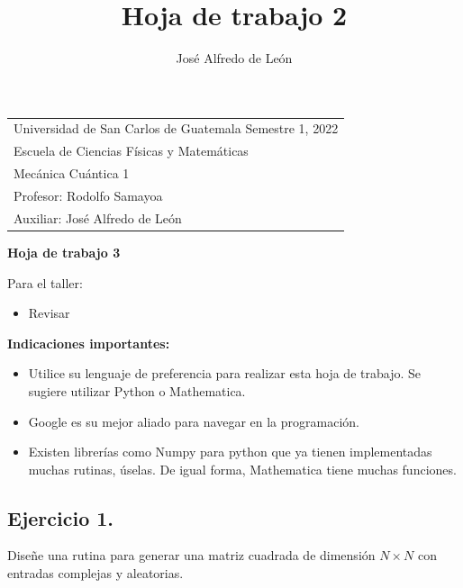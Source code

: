 \documentclass[11pt,letterpaper]{article}
\author{José Alfredo de León}
\title{Hoja de trabajo 2 \hspace{\fill}}
\begin{document}
\noindent
{}
\hspace{23mm}
\begin{tabular}{p{149mm}}
Universidad de San Carlos de Guatemala \hspace*{\fill} Semestre 1, 2022 \\
Escuela de Ciencias Físicas y Matemáticas  \\
Mecánica Cuántica 1            \\
Profesor: Rodolfo Samayoa      \\
Auxiliar: José Alfredo de León \\
\end{tabular}

\begin{center}
\bf\Large Hoja de trabajo 3
\end{center}

\noindent
\textcolor{jacolor}{
Para el taller: 
\begin{itemize}
\item Revisar 
\end{itemize}
}

\noindent\textbf{Indicaciones importantes:}
\begin{itemize}
\item Utilice su lenguaje de preferencia para realizar esta hoja de trabajo.
Se sugiere utilizar Python o Mathematica.
\item Google es su mejor aliado para navegar en la programación. 
\item Existen librerías como Numpy para python que ya tienen implementadas
muchas rutinas, úselas. De igual forma, Mathematica tiene muchas funciones.
\end{itemize}

\subsection*{Ejercicio 1. }
Diseñe una rutina para generar una matriz cuadrada de dimensión $N\times N$
con entradas complejas y aleatorias.
\end{document}
